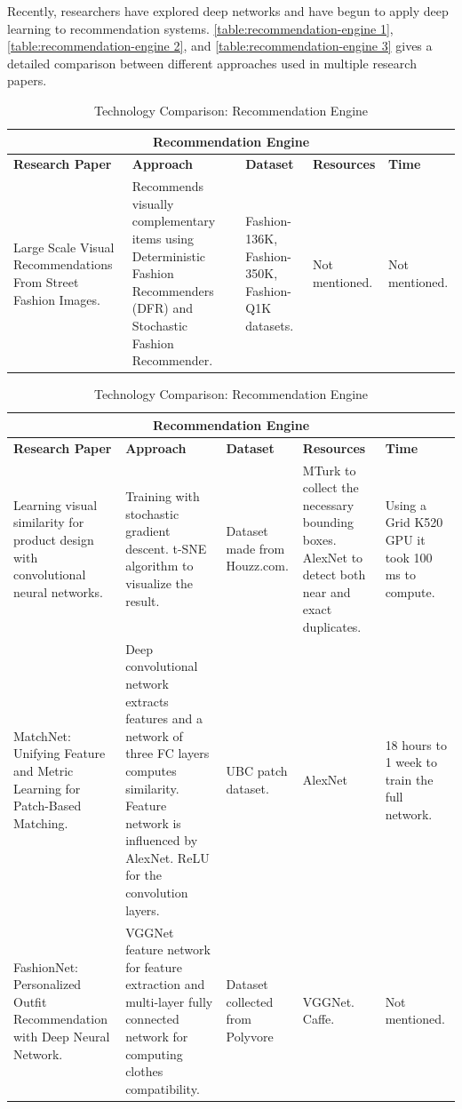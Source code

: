 Recently, researchers have explored deep networks and have begun to apply deep learning to recommendation systems. \autoref{table:recommendation-engine 1}, \autoref{table:recommendation-engine 2}, and \autoref{table:recommendation-engine 3} gives a detailed comparison between different approaches used in multiple research papers. \newline

\begin{table}[H]
\begin{tabular}{ @{}|p{3cm}|p{4cm}|p{2.5cm}|p{2.5cm}|p{2.5cm}|  }
 \hline
 \multicolumn{5}{|c|}{\textbf{Recommendation Engine}} \\
 \hline
 \textbf{Research Paper} & \textbf{Approach} & \textbf{Dataset} & \textbf{Resources} & \textbf{Time}\\
 \hline
Large Scale Visual Recommendations From Street Fashion Images.
  & Recommends visually complementary items using Deterministic Fashion Recommenders (DFR) and Stochastic Fashion Recommender.
    & Fashion-136K, Fashion-350K, Fashion-Q1K datasets. & Not mentioned. & Not mentioned.\\
\hline
\end{tabular}
\caption{Technology Comparison: Recommendation Engine}
\label{table:recommendation-engine 1}
\end{table}


\begin{table}[H]
\begin{tabular}{ @{}|p{3cm}|p{4cm}|p{2.5cm}|p{2.5cm}|p{2.5cm}|  }
 \hline
 \multicolumn{5}{|c|}{\textbf{Recommendation Engine}} \\
 \hline
 \textbf{Research Paper} & \textbf{Approach} & \textbf{Dataset} & \textbf{Resources} & \textbf{Time}\\
 \hline
 
  Learning visual similarity for product design with convolutional neural networks. & 
Training with stochastic gradient descent. t-SNE algorithm to visualize the result. & Dataset made from Houzz.com. & MTurk to collect the necessary bounding boxes. AlexNet to detect both near and exact duplicates. & Using a Grid K520 GPU it took 100 ms to compute.\\
\hline

MatchNet: Unifying Feature and Metric Learning for Patch-Based Matching. & Deep convolutional network extracts features and a network of three FC layers computes similarity. Feature network is influenced by AlexNet. ReLU for the convolution layers. & UBC patch dataset. & AlexNet & 18 hours to 1 week to train the full network.\\
  \hline
FashionNet: Personalized Outfit Recommendation with Deep Neural Network. & VGGNet feature network for feature extraction and multi-layer fully connected network for computing clothes compatibility. & Dataset collected from Polyvore & VGGNet. Caffe. & Not mentioned. \\
 \hline
 
\end{tabular}
\caption{Technology Comparison: Recommendation Engine}
\label{table:recommendation-engine 2}
\end{table}


